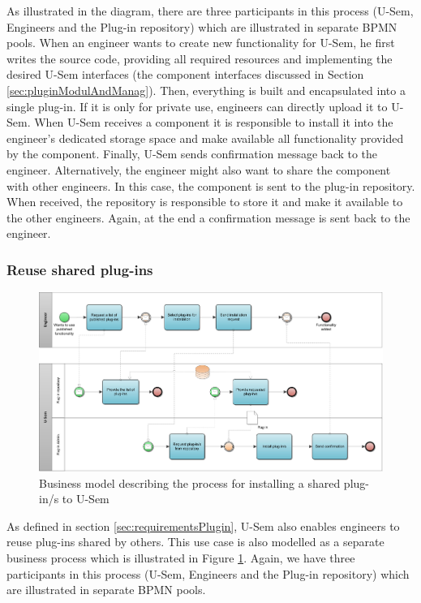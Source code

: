 As illustrated in the diagram, there are three participants in this process (U-Sem, Engineers and the Plug-in repository) which are illustrated in separate BPMN pools. When an engineer wants to create new functionality for U-Sem, he first writes the source code, providing all required resources and implementing the desired U-Sem interfaces (the component interfaces discussed in Section \ref{sec:pluginModulAndManag}). Then, everything is built and encapsulated into a single plug-in. If it is only for private use, engineers can directly upload it to U-Sem. When U-Sem receives a component it is responsible to install it into the engineer's dedicated storage space and make available all functionality provided by the component. Finally, U-Sem sends confirmation message back to the engineer. Alternatively, the engineer might also want to share the component with other engineers. In this case, the component is sent to the plug-in repository. When received, the repository is responsible to store it and make it available to the other engineers. Again, at the end a confirmation message is sent back to the engineer.

\subsubsection{Reuse shared plug-ins}

\begin{figure}[h!]
  \centering
  	\includegraphics[scale=0.75,angle=270]{plug-in/business_processes/InstallPlugInFromRepoBusinessModel.jpg}
  \caption{Business model describing the process for installing a shared plug-in/s to U-Sem}
  \label{fig_repo_bpm}
\end{figure}

As defined in section \ref{sec:requirementsPlugin}, U-Sem also enables engineers to reuse plug-ins shared by others. This use case is also modelled as a separate business process which is illustrated in Figure \ref{fig_repo_bpm}. Again, we have three participants in this process (U-Sem, Engineers and the Plug-in repository) which are illustrated in separate BPMN pools. 


